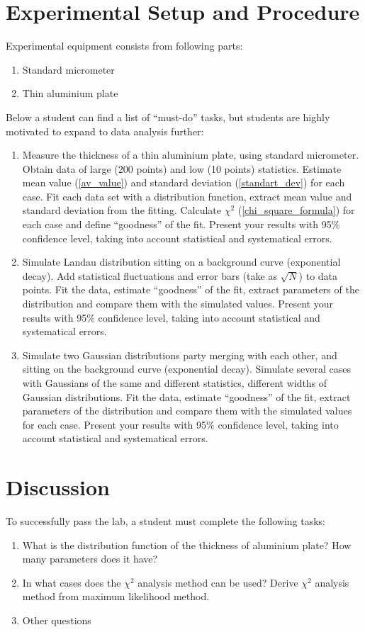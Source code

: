 \documentclass[12pt,a4paper]{report}
\begin{document}
\section{Experimental Setup and Procedure}
Experimental equipment consists from following parts:
\begin{enumerate}
\item Standard micrometer
\item Thin aluminium plate
\end{enumerate}
Below a student can find a list of \enquote{must-do} tasks, but students are highly motivated to expand to data analysis further:

\begin{enumerate}
\item Measure the thickness of a thin aluminium plate, using standard micrometer. Obtain data of large (200 points) and low (10 points) statistics. Estimate mean value (\ref{av_value}) and standard deviation (\ref{standart_dev}) for each case. Fit each data set with a distribution function, extract mean value and standard deviation from the fitting. Calculate $\chi^2$ (\ref{chi_square_formula}) for each case and define \enquote{goodness} of the fit. Present your results with 95$\%$ confidence level, taking into account statistical and systematical errors. 
\item Simulate Landau distribution sitting on a background curve (exponential decay). Add statistical fluctuations and error bars (take as $\sqrt{N}$) to data points. Fit the data, estimate \enquote{goodness} of the fit, extract parameters of the distribution and compare them with the simulated values. Present your results with 95$\%$ confidence level, taking into account statistical and systematical errors.
\item Simulate two Gaussian distributions party merging with each other, and sitting on the background curve (exponential decay). Simulate several cases with Gaussians of the same and different statistics, different widths of Gaussian distributions. Fit the data, estimate \enquote{goodness} of the fit, extract parameters of the distribution and compare them with the simulated values for each case. Present your results with 95$\%$ confidence level, taking into account statistical and systematical errors.
\end{enumerate}

\section{Discussion}
To successfully pass the lab, a student must complete the following tasks:
\begin{enumerate}
\item What is the distribution function of the thickness of aluminium plate? How many parameters does it have? 
\item In what cases does the $\chi^2$ analysis method can be used? Derive $\chi^2$ analysis method from maximum likelihood method.
\item Other questions
\end{enumerate}
\end{document}
